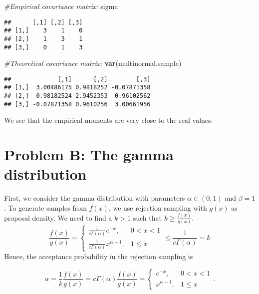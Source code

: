 \documentclass[]{article}
\newenvironment{Shaded}{\begin{snugshade}}{\end{snugshade}}
\newcommand{\CommentTok}[1]{\textcolor[rgb]{0.56,0.35,0.01}{\textit{#1}}}
\newcommand{\KeywordTok}[1]{\textcolor[rgb]{0.13,0.29,0.53}{\textbf{#1}}}
\newcommand{\NormalTok}[1]{#1}
\begin{document}
\begin{Shaded}
\begin{Highlighting}[]
\CommentTok{#Empirical covariance matrix:}
\NormalTok{sigma}
\end{Highlighting}
\end{Shaded}

\begin{verbatim}
##      [,1] [,2] [,3]
## [1,]    3    1    0
## [2,]    1    3    1
## [3,]    0    1    3
\end{verbatim}

\begin{Shaded}
\begin{Highlighting}[]
\CommentTok{#Theoretical covariance matrix:}
\KeywordTok{var}\NormalTok{(multinormal.sample)}
\end{Highlighting}
\end{Shaded}

\begin{verbatim}
##             [,1]      [,2]        [,3]
## [1,]  3.00486175 0.9818252 -0.07871358
## [2,]  0.98182524 2.9452353  0.96102562
## [3,] -0.07871358 0.9610256  3.00661956
\end{verbatim}

We see that the empirical moments are very close to the real values.

\hypertarget{problem-b-the-gamma-distribution}{%
\section{Problem B: The gamma
distribution}\label{problem-b-the-gamma-distribution}}

First, we consider the gamma distribution with parameters
\(\alpha \in (0,1)\) and \(\beta=1\). To generate samples from \(f(x)\),
we use rejection sampling with \(g(x)\) as proposal density. We need to
find a \(k>1\) such that \(k\geq\frac{f(x)}{g(x)}\). \[
\frac{f(x)}{g(x)}=\begin{cases}\frac{1}{c\Gamma(\alpha)}e^{-x}, & 0<x<1 \\ \frac{1}{c\Gamma(\alpha)}x^{\alpha -1}, & 1 \leq x \end{cases}\leq \frac{1}{c\Gamma(\alpha)}=k
\] Hence, the acceptance probability in the rejection sampling is

\[
\alpha=\frac{1}{k}\frac{f(x)}{g(x)}=c\Gamma(\alpha)\frac{f(x)}{g(x)}=\begin{cases}e^{-x}, & 0<x<1 \\ x^{\alpha -1}, & 1 \leq x \end{cases}.
\]
\end{document}
